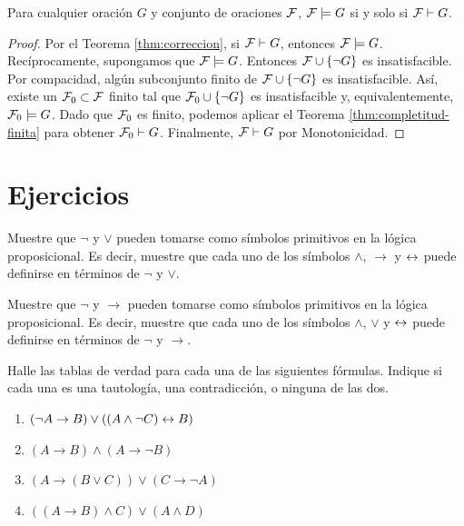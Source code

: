 \documentclass[12pt,a4paper]{book}
\begin{document}
    \begin{teorema}\label{thm:completitud}
        Para cualquier oración $G$ y conjunto de oraciones $\mathcal{F}$, $\mathcal{F}\models G$ si y solo si $\mathcal{F}\vdash G$.
    \end{teorema}
    \begin{proof}
        Por el Teorema \ref{thm:correccion}, si $\mathcal{F}\vdash G$, entonces $\mathcal{F}\models G$.\\
        Recíprocamente, supongamos que $\mathcal{F}\models G$. Entonces $\mathcal{F}\cup\{\neg G\}$ es insatisfacible. Por compacidad,
        algún subconjunto finito de $\mathcal{F}\cup\{\neg G\}$ es insatisfacible. Así, existe un $\mathcal{F}_{0}\subset\mathcal{F}$ finito tal
        que $\mathcal{F}_{0}\cup\{\neg G\}$ es insatisfacible y, equivalentemente, $\mathcal{F}_{0}\models G$. Dado que $\mathcal{F}_{0}$ es finito,
        podemos aplicar el Teorema \ref{thm:completitud-finita} para obtener $\mathcal{F}_{0}\vdash G$. Finalmente,
        $\mathcal{F}\vdash G$ por Monotonicidad.
    \end{proof}

    \section*{Ejercicios}

    \begin{ejercicio}
        Muestre que $\neg$ y $\vee$ pueden tomarse como símbolos primitivos en la lógica proposicional. Es decir, muestre
        que cada uno de los símbolos $\wedge$, $\rightarrow$ y $\leftrightarrow$ puede definirse en términos de $\neg$ y $\vee$.
    \end{ejercicio}

    \begin{ejercicio}
        Muestre que $\neg$ y $\rightarrow$ pueden tomarse como símbolos primitivos en la lógica proposicional. Es decir,
        muestre que cada uno de los símbolos $\wedge$, $\vee$ y $\leftrightarrow$ puede definirse en términos de $\neg$ y $\rightarrow$.
    \end{ejercicio}

    \begin{ejercicio}\label{ej:tablas-verdad-varias}
        Halle las tablas de verdad para cada una de las siguientes fórmulas. Indique si cada una es una tautología, una
        contradicción, o ninguna de las dos.
        \begin{enumerate}[label=(\alph*)]
            \item $(\neg A\rightarrow B)\vee((A\wedge\neg C)\leftrightarrow B)$
            \item $(A\rightarrow B)\wedge(A\rightarrow\neg B)$
            \item $(A\rightarrow(B\vee C))\vee(C\rightarrow\neg A)$
            \item $((A\rightarrow B)\wedge C)\vee(A\wedge D)$
        \end{enumerate}
    \end{ejercicio}
\end{document}
